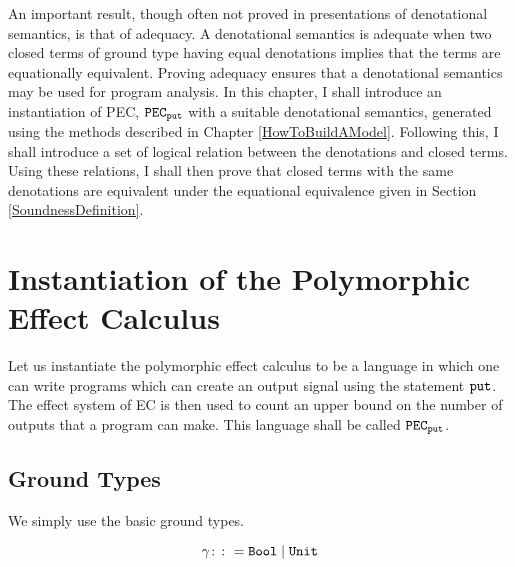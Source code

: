     

    An important result, though often not proved in presentations of denotational semantics, is that of adequacy. A denotational semantics is adequate when two closed terms of ground type having equal denotations implies that the terms are equationally equivalent. Proving adequacy ensures that a denotational semantics may be used for program analysis. In this chapter, I shall introduce an instantiation of PEC,  $\texttt{PEC}_{\texttt{put}}$ with a suitable denotational semantics, generated using the methods described in Chapter \ref{HowToBuildAModel}. Following this, I shall introduce a set of logical relation between the denotations and closed terms. Using these relations, I shall then prove that closed terms with the same denotations are equivalent under the equational equivalence given in Section \ref{SoundnessDefinition}.

    \section{Instantiation of the Polymorphic Effect Calculus}
    Let us instantiate the polymorphic effect calculus to be a language in which one can write programs which can create an output signal using the statement $\texttt{put}$. The effect system of EC is then used to count an upper bound on the number of outputs that a program can make. This language shall be called $\texttt{PEC}_{\texttt{put}}$.

    \subsection{Ground Types}
    We simply use the basic ground types.

    \begin{equation}
        \label{AdequacyGroundTypes}
        \gamma \colon\colon= \texttt{Bool} \mid \texttt{Unit}
    \end{equation}

